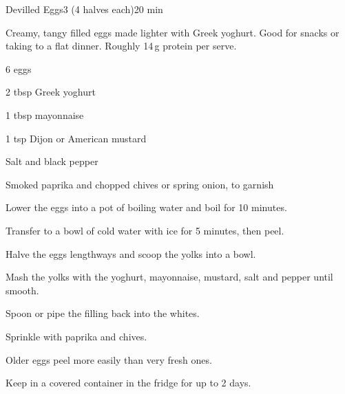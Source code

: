 \begin{recipebox}{Devilled Eggs}{3 (4 halves each)}{20 min}

Creamy, tangy filled eggs made lighter with Greek yoghurt. Good for snacks or
taking to a flat dinner. Roughly 14\,g protein per serve.

\begin{ingredients}
  \item 6 eggs
  \item 2 tbsp Greek yoghurt
  \item 1 tbsp mayonnaise
  \item 1 tsp Dijon or American mustard
  \item Salt and black pepper
  \item Smoked paprika and chopped chives or spring onion, to garnish
\end{ingredients}

\begin{method}
  \item Lower the eggs into a pot of boiling water and boil for 10 minutes.
  \item Transfer to a bowl of cold water with ice for 5 minutes, then peel.
  \item Halve the eggs lengthways and scoop the yolks into a bowl.
  \item Mash the yolks with the yoghurt, mayonnaise, mustard, salt and pepper until smooth.
  \item Spoon or pipe the filling back into the whites.
  \item Sprinkle with paprika and chives.
\end{method}

\begin{notelist}
  \item Older eggs peel more easily than very fresh ones.
  \item Keep in a covered container in the fridge for up to 2 days.
\end{notelist}

\end{recipebox}
